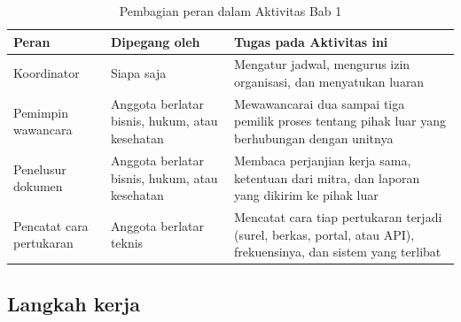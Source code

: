 \begin{table}[!htb]
  \centering
  \caption{Pembagian peran dalam Aktivitas Bab 1}
  \label{tab:ch01-peran}
  \begin{tabularx}{\textwidth}{>{\raggedright\arraybackslash}p{2.6cm}
                               >{\raggedright\arraybackslash}p{3.0cm}
                               >{\raggedright\arraybackslash}X}
    \hline
    \textbf{Peran} & \textbf{Dipegang oleh} & \textbf{Tugas pada Aktivitas ini} \\
    \hline
    Koordinator & Siapa saja & Mengatur jadwal, mengurus izin organisasi, dan menyatukan luaran \\
    \hline
    Pemimpin wawancara & Anggota berlatar bisnis, hukum, atau kesehatan & Mewawancarai dua sampai tiga pemilik proses tentang pihak luar yang berhubungan dengan unitnya \\
    \hline
    Penelusur dokumen & Anggota berlatar bisnis, hukum, atau kesehatan & Membaca perjanjian kerja sama, ketentuan dari mitra, dan laporan yang dikirim ke pihak luar \\
    \hline
    Pencatat cara pertukaran & Anggota berlatar teknis & Mencatat cara tiap pertukaran terjadi (surel, berkas, portal, atau API), frekuensinya, dan sistem yang terlibat \\
    \hline
  \end{tabularx}
\end{table}

\subsection*{Langkah kerja}

